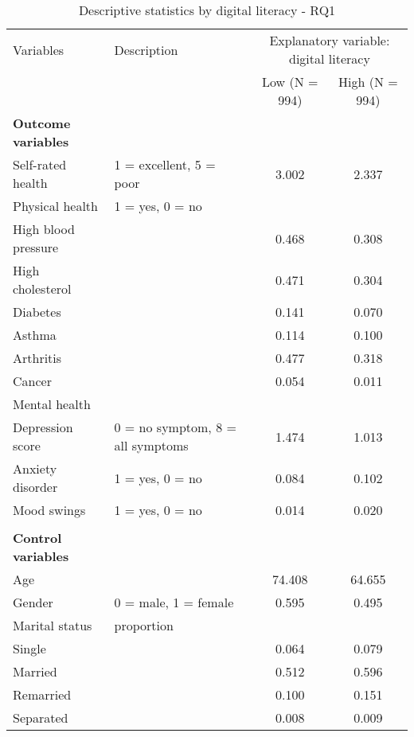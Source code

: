 \documentclass[12pt]{article}
\begin{document}
    \begin{sidewaystable}[h!]
        \centering
        \caption{Descriptive statistics by digital literacy - RQ1}
        \label{tab:desc_stats_rq1}
        \begin{tabular}{llcc}
            \toprule
            Variables & Description & \multicolumn{2}{c}{Explanatory variable: digital literacy} \\
            & & Low (N = 994) & High (N = 994) \\
            \midrule
            \textbf{Outcome variables} & & & \\
            Self-rated health & 1 = excellent, 5 = poor & 3.002 & 2.337 \\
            Physical health & 1 = yes, 0 = no & \\
            High blood pressure &  & 0.468 & 0.308 \\
            High cholesterol &  & 0.471 & 0.304 \\
            Diabetes &  & 0.141 & 0.070 \\
            Asthma &  & 0.114 & 0.100 \\
            Arthritis &  & 0.477 & 0.318 \\
            Cancer &  & 0.054 & 0.011 \\
            Mental health & & \\
            Depression score & 0 = no symptom, 8 = all symptoms & 1.474 & 1.013 \\
            Anxiety disorder & 1 = yes, 0 = no & 0.084 & 0.102 \\
            Mood swings & 1 = yes, 0 = no & 0.014 & 0.020 \\
            & & & \\
            \textbf{Control variables} & & & \\
            Age &  & 74.408 & 64.655 \\
            Gender & 0 = male, 1 = female & 0.595 & 0.495 \\
            Marital status & proportion & & \\
            \hspace{0.5cm} Single &  & 0.064 & 0.079 \\
            \hspace{0.5cm} Married &  & 0.512 & 0.596 \\
            \hspace{0.5cm} Remarried &  & 0.100 & 0.151 \\
            \hspace{0.5cm} Separated &  & 0.008 & 0.009 \\

\end{tabular}
\end{sidewaystable}
\end{document}
